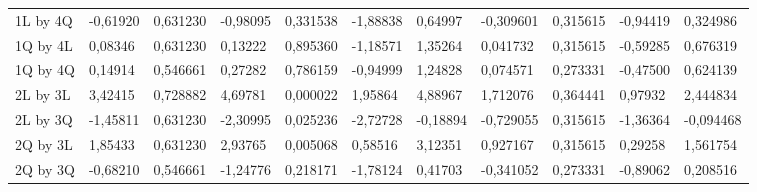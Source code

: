 \begin{table}[H]
{\begin{tabular}{lllllllllll}
\rowcolor[HTML]{FFFFFF} 
1L by 4Q       & {\color[HTML]{333333} -0,61920} & {\color[HTML]{333333} 0,631230} & {\color[HTML]{333333} -0,98095} & {\color[HTML]{333333} 0,331538} & {\color[HTML]{333333} -1,88838} & {\color[HTML]{333333} 0,64997}  & {\color[HTML]{333333} -0,309601} & {\color[HTML]{333333} 0,315615} & {\color[HTML]{333333} -0,94419} & {\color[HTML]{333333} 0,324986}  \\
\rowcolor[HTML]{FFFFFF} 
1Q by 4L       & {\color[HTML]{333333} 0,08346}  & {\color[HTML]{333333} 0,631230} & {\color[HTML]{333333} 0,13222}  & {\color[HTML]{333333} 0,895360} & {\color[HTML]{333333} -1,18571} & {\color[HTML]{333333} 1,35264}  & {\color[HTML]{333333} 0,041732}  & {\color[HTML]{333333} 0,315615} & {\color[HTML]{333333} -0,59285} & {\color[HTML]{333333} 0,676319}  \\
\rowcolor[HTML]{FFFFFF} 
1Q by 4Q       & {\color[HTML]{333333} 0,14914}  & {\color[HTML]{333333} 0,546661} & {\color[HTML]{333333} 0,27282}  & {\color[HTML]{333333} 0,786159} & {\color[HTML]{333333} -0,94999} & {\color[HTML]{333333} 1,24828}  & {\color[HTML]{333333} 0,074571}  & {\color[HTML]{333333} 0,273331} & {\color[HTML]{333333} -0,47500} & {\color[HTML]{333333} 0,624139}  \\
\rowcolor[HTML]{FFFFFF} 
2L by 3L       & {\color[HTML]{FF0000} 3,42415}  & {\color[HTML]{FF0000} 0,728882} & {\color[HTML]{FF0000} 4,69781}  & {\color[HTML]{FF0000} 0,000022} & {\color[HTML]{FF0000} 1,95864}  & {\color[HTML]{FF0000} 4,88967}  & {\color[HTML]{FF0000} 1,712076}  & {\color[HTML]{FF0000} 0,364441} & {\color[HTML]{FF0000} 0,97932}  & {\color[HTML]{FF0000} 2,444834}  \\
\rowcolor[HTML]{FFFFFF} 
2L by 3Q       & {\color[HTML]{FF0000} -1,45811} & {\color[HTML]{FF0000} 0,631230} & {\color[HTML]{FF0000} -2,30995} & {\color[HTML]{FF0000} 0,025236} & {\color[HTML]{FF0000} -2,72728} & {\color[HTML]{FF0000} -0,18894} & {\color[HTML]{FF0000} -0,729055} & {\color[HTML]{FF0000} 0,315615} & {\color[HTML]{FF0000} -1,36364} & {\color[HTML]{FF0000} -0,094468} \\
\rowcolor[HTML]{FFFFFF} 
2Q by 3L       & {\color[HTML]{FF0000} 1,85433}  & {\color[HTML]{FF0000} 0,631230} & {\color[HTML]{FF0000} 2,93765}  & {\color[HTML]{FF0000} 0,005068} & {\color[HTML]{FF0000} 0,58516}  & {\color[HTML]{FF0000} 3,12351}  & {\color[HTML]{FF0000} 0,927167}  & {\color[HTML]{FF0000} 0,315615} & {\color[HTML]{FF0000} 0,29258}  & {\color[HTML]{FF0000} 1,561754}  \\
\rowcolor[HTML]{FFFFFF} 
2Q by 3Q       & {\color[HTML]{333333} -0,68210} & {\color[HTML]{333333} 0,546661} & {\color[HTML]{333333} -1,24776} & {\color[HTML]{333333} 0,218171} & {\color[HTML]{333333} -1,78124} & {\color[HTML]{333333} 0,41703}  & {\color[HTML]{333333} -0,341052} & {\color[HTML]{333333} 0,273331} & {\color[HTML]{333333} -0,89062} & {\color[HTML]{333333} 0,208516}  \\

\end{tabular}}
\end{table}
